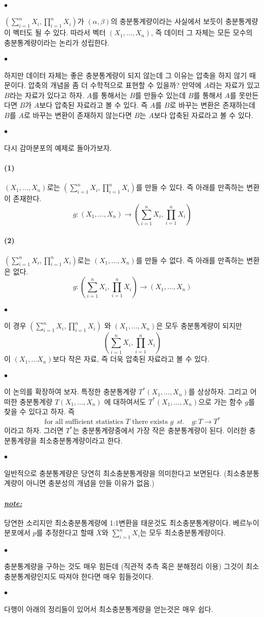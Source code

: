\documentclass[12pt,oneside,english]{book}
\def\ck{\paragraph{\Large$\bullet$}\Large}
\def\note{\paragraph{\Large\textit{\underline{note:}}}\Large}
\def\one{\paragraph{\Large(1)}\Large}
\def\two{\paragraph{\Large(2)}\Large}
\begin{document}
\ck $(\sum_{i=1}^{n} X_i,\prod_{i=1}^{n} X_i)$가 $(\alpha,\beta)$의 충분통계량이라는 사실에서 보듯이 충분통계량이 벡터도 될 수 있다. 따라서 벡터 $(X_1,\dots,X_n)$, 즉 데이터 그 자체는 모든 모수의 충분통계량이라는 논리가 성립한다. 

\ck 하지만 데이터 자체는 좋은 충분통계량이 되지 않는데 그 이유는 압축을 하지 않기 때문이다. 압축의 개념을 좀 더 수학적으로 표현할 수 있을까? 만약에 $A$라는 자료가 있고 $B$라는 자료가 있다고 하자. $A$를 통해서는 $B$를 만들수 있는데 $B$를 통해서 $A$를 못만든다면 $B$가 $A$보다 압축된 자료라고 볼 수 있다. 즉 $A$를 $B$로 바꾸는 변환은 존재하는데 $B$를 $A$로 바꾸는 변환이 존재하지 않는다면 $B$는 $A$보다 압축된 자료라고 볼 수 있다. 

\ck 다시 감마분포의 예제로 돌아가보자. 

\one $(X_1,\dots,X_n)$로는 $(\sum_{i=1}^{n} X_i,\prod_{i=1}^{n} X_i)$를 만들 수 있다. 즉 아래를 만족하는 변환이 존재한다.
\[
g: (X_1,\dots,X_n) \to \left(\sum_{i=1}^{n} X_i,\prod_{i=1}^{n} X_i\right)
\] 
\two $(\sum_{i=1}^{n} X_i,\prod_{i=1}^{n} X_i)$로는 $(X_1,\dots,X_n)$를 만들 수 없다. 즉 아래를 만족하는 변환은 없다. 
\[
g: \left(\sum_{i=1}^{n} X_i,\prod_{i=1}^{n} X_i\right) \to (X_1,\dots,X_n)
\]

\ck 이 경우 $(\sum_{i=1}^{n} X_i,\prod_{i=1}^{n} X_i)$ 와 $(X_1,\dots,X_n)$은 모두 충분통계량이 되지만 
\[
\left(\sum_{i=1}^{n} X_i,\prod_{i=1}^{n} X_i\right)
\]
이 $(X_1,\dots X_n)$보다 작은 자료, 즉 더욱 압축된 자료라고 볼 수 있다. 

\ck 이 논의를 확장하여 보자. 특정한 충분통계량 $T^*(X_1,\dots,X_n)$를 상상하자. 그리고 어떠한 충분통계량 $T(X_1,\dots,X_n)$ 에 대하여서도 $T^*(X_1,\dots,X_n)$으로 가는 함수 $g$를 찾을 수 있다고 하자. 즉
\[
\mbox{for all sufficient statistics } T \mbox{ there exists } g ~~ st. \quad g: T \to T^*
\]
이라고 하자. 그러면 $T^*$는 충분통계량중에서 가장 작은 충분통계량이 된다. 이러한 충분통계량을 최소충분통계량이라고 한다. 

\ck 일반적으로 충분통계량은 당연히 최소충분통계량을 의미한다고 보면된다. (최소충분통계량이 아니면 충분성의 개념을 만들 이유가 없음.)

\note 당연한 소리지만 최소충분통계량에 1:1변환을 태운것도 최소충분통계량이다. 베르누이 분포에서 $p$를 추정한다고 할때 $\bar{X}$와 $\sum_{i=1}^{n}X_i$는 모두 최소충분통계량이다. 

\ck 충분통계량을 구하는 것도 매우 힘든데 (직관적 추측 혹은 분해정리 이용) 그것이 최소충분통계량인지도 따져야 한다면 매우 힘들것이다. 

\ck 다행이 아래의 정리들이 있어서 최소충분통계량을 얻는것은 매우 쉽다. 
\end{document}
